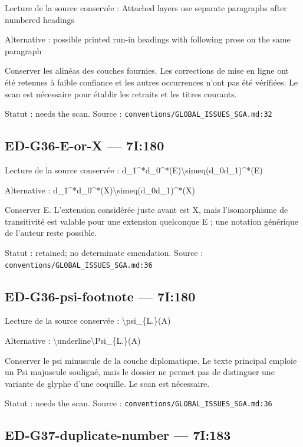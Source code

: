 Lecture de la source conservée : Attached layers use separate paragraphs after numbered headings

Alternative : possible printed run-in headings with following prose on the same paragraph

Conserver les alinéas des couches fournies. Les corrections de mise en ligne ont été retenues à faible confiance et les autres occurrences n’ont pas été vérifiées. Le scan est nécessaire pour établir les retraits et les titres courants.

Statut : needs the scan. Source : \nolinkurl{conventions/GLOBAL_ISSUES_SGA.md:32}

\subsection*{ED-G36-E-or-X — 7I:180}

Lecture de la source conservée : d\_1\textasciicircum{}*d\_0\textasciicircum{}*(E)\textbackslash{}simeq(d\_0d\_1)\textasciicircum{}*(E)

Alternative : d\_1\textasciicircum{}*d\_0\textasciicircum{}*(X)\textbackslash{}simeq(d\_0d\_1)\textasciicircum{}*(X)

Conserver E. L’extension considérée juste avant est X, mais l’isomorphisme de transitivité est valable pour une extension quelconque E ; une notation générique de l’auteur reste possible.

Statut : retained; no determinate emendation. Source : \nolinkurl{conventions/GLOBAL_ISSUES_SGA.md:36}

\subsection*{ED-G36-psi-footnote — 7I:180}

Lecture de la source conservée : \textbackslash{}psi\_\{L.\}(A)

Alternative : \textbackslash{}underline\textbackslash{}Psi\_\{L.\}(A)

Conserver le psi minuscule de la couche diplomatique. Le texte principal emploie un Psi majuscule souligné, mais le dossier ne permet pas de distinguer une variante de glyphe d’une coquille. Le scan est nécessaire.

Statut : needs the scan. Source : \nolinkurl{conventions/GLOBAL_ISSUES_SGA.md:36}

\subsection*{ED-G37-duplicate-number — 7I:183}

